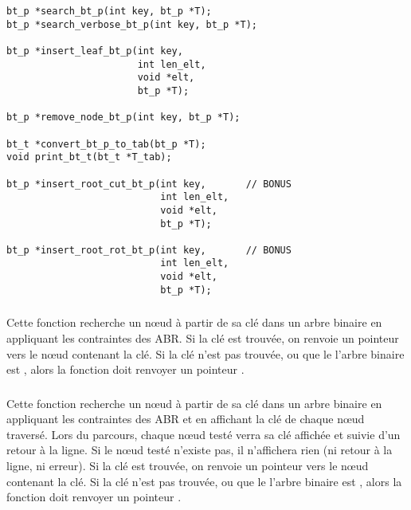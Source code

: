 \lstset{language=C}
\begin{lstlisting}[frame=single]
bt_p *search_bt_p(int key, bt_p *T);
bt_p *search_verbose_bt_p(int key, bt_p *T);

bt_p *insert_leaf_bt_p(int key,
                       int len_elt,
                       void *elt,
                       bt_p *T);

bt_p *remove_node_bt_p(int key, bt_p *T);

bt_t *convert_bt_p_to_tab(bt_p *T);
void print_bt_t(bt_t *T_tab);

bt_p *insert_root_cut_bt_p(int key,       // BONUS
                           int len_elt,
                           void *elt,
                           bt_p *T);

bt_p *insert_root_rot_bt_p(int key,       // BONUS
                           int len_elt,
                           void *elt,
                           bt_p *T);
\end{lstlisting}


\subsubsection*{}

\noindent Cette fonction recherche un nœud à partir de sa clé dans un arbre binaire en appliquant les contraintes des ABR.
Si la clé est trouvée, on renvoie un pointeur vers le nœud contenant la clé.
Si la clé n'est pas trouvée, ou que le l'arbre binaire est , alors la fonction doit renvoyer un pointeur .

\bigskip


\subsubsection*{}

\noindent Cette fonction recherche un nœud à partir de sa clé dans un arbre binaire en appliquant les contraintes des ABR et en affichant la clé de chaque nœud traversé.
Lors du parcours, chaque nœud testé verra sa clé affichée et suivie d'un retour à la ligne.
Si le nœud testé n'existe pas, il n'affichera rien (ni retour à la ligne, ni erreur).
Si la clé est trouvée, on renvoie un pointeur vers le nœud contenant la clé.
Si la clé n'est pas trouvée, ou que le l'arbre binaire est , alors la fonction doit renvoyer un pointeur .


